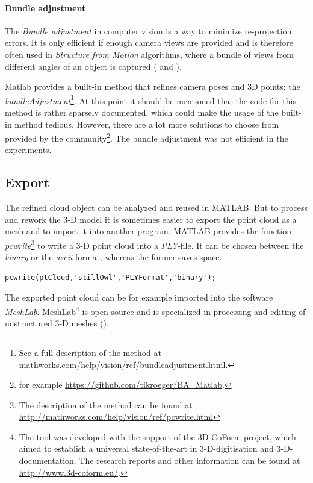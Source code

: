 \paragraph{Bundle adjustment}
The \textit{Bundle adjustment} in computer vision is a way to minimize re-projection errors. It is only efficient if enough camera views are provided and is therefore often used in \textit{Structure from Motion} algorithms, where a bundle of views from different angles of an object is captured (\cite[p.320 et seq.]{Szeliski.2011} and \cite[p.322 et seq.]{Luhmann.2014}).

Matlab provides a built-in method that refines camera poses and 3D points: the \textit{bundleAdjustment}\footnote{See a full description of the method at \url{mathworks.com/help/vision/ref/bundleadjustment.html}.}. At this point it should be mentioned that the code for this method is rather sparsely documented, which could make the usage of the built-in method tedious. However, there are a lot more solutions to choose from provided by the community\footnote{for example \url{https://github.com/tikroeger/BA_Matlab}.}. The bundle adjustment was not efficient in the experiments.

\subsection{Export}\label{ssec:Export}
The refined cloud object can be analyzed and reused in MATLAB. But to process and rework the 3-D model it is sometimes easier to export the point cloud as a mesh and to import it into another program. MATLAB provides the function \textit{pcwrite}\footnote{The description of the method can be found at \url{http://mathworks.com/help/vision/ref/pcwrite.html}} to write a 3-D point cloud into a \textit{PLY}-file. It can be chosen between the \textit{binary} or the \textit{ascii} format, whereas the former saves space. 

\begin{lstlisting}[caption={Export of the point cloud into a PLY file with binary format.}]
pcwrite(ptCloud,'stillOwl','PLYFormat','binary');
\end{lstlisting}

The exported point cloud can be for example imported into the software \textit{MeshLab}. MeshLab\footnote{The tool was developed with the support of the 3D-CoForm project, which aimed to establish a universal state-of-the-art in 3-D-digitisation and 3-D-documentation. The research reports and other information can be found at \url{http://www.3d-coform.eu/}.} is open source and is specialized in processing and editing of unstructured 3-D meshes (\cite{Meshlab.2016}).